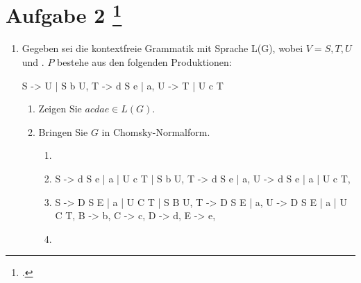 \documentclass{lehramt-informatik-aufgabe}
\begin{document}
\let\schrittE=\liChomskyUeberErklaerung

\liAufgabenTitel{}
\section{Aufgabe 2
\footcite{66115:2017:03}}

\begin{enumerate}
\item Gegeben sei die kontextfreie Grammatik \liGrammatik{} mit Sprache
L(G), wobei $V = {S,T, U}$ und . $P$ bestehe
aus den folgenden Produktionen:

\begin{liProduktionsRegeln}
S -> U | S b U,
T -> d S e | a,
U -> T | U c T
\end{liProduktionsRegeln}

\begin{enumerate}

\item Zeigen Sie $a c d a e \in L(G)$.

\begin{liAntwort}
\end{liAntwort}


\item Bringen Sie $G$ in Chomsky-Normalform.

\begin{liAntwort}
\begin{enumerate}
\item \schrittE{1}

\liNichtsZuTun

\item \schrittE{2}

\begin{liProduktionsRegeln}
S -> d S e | a | U c T | S b U,
T -> d S e | a,
U -> d S e | a | U c T,
\end{liProduktionsRegeln}

\item \schrittE{3}

\begin{liProduktionsRegeln}
S -> D S E | a | U C T | S B U,
T -> D S E | a,
U -> D S E | a | U C T,
B -> b,
C -> c,
D -> d,
E -> e,
\end{liProduktionsRegeln}

\item \schrittE{4}


\end{enumerate}
\end{liAntwort}
\end{enumerate}
\end{enumerate}
\end{document}
